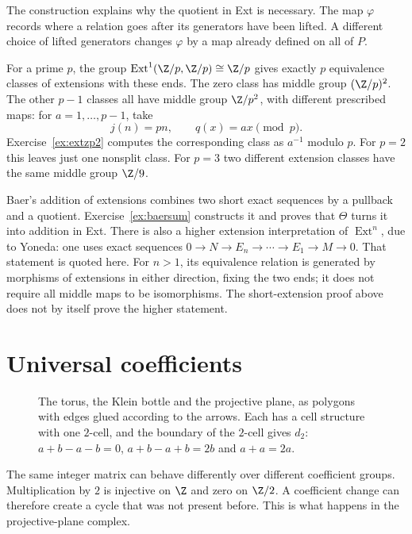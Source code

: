 The construction explains why the quotient in Ext is necessary. The map $\varphi$ records where a relation goes after its generators have been lifted. A different choice of lifted generators changes $\varphi$ by a map already defined on all of $P$.

\begin{example}\label{ex:extzp}
For a prime $p$, the group $\operatorname{Ext}^1(\Z/p,\Z/p)\cong\Z/p$ gives exactly $p$ equivalence classes of extensions with these ends. The zero class has middle group $(\Z/p)^2$. The other $p-1$ classes all have middle group $\Z/p^2$, with different prescribed maps: for $a=1,\ldots,p-1$, take
\[
j(n)=pn,\qquad q(x)=ax\pmod p.
\]
Exercise~\ref{ex:extzp2} computes the corresponding class as $a^{-1}$ modulo $p$. For $p=2$ this leaves just one nonsplit class. For $p=3$ two different extension classes have the same middle group $\Z/9$.
\end{example}

Baer's addition of extensions combines two short exact sequences by a pullback and a quotient. Exercise~\ref{ex:baersum} constructs it and proves that $\Theta$ turns it into addition in Ext. There is also a higher extension interpretation of $\operatorname{Ext}^n$, due to Yoneda: one uses exact sequences
$0\to N\to E_n\to\cdots\to E_1\to M\to0$.
That statement is quoted here. For $n>1$, its equivalence relation is generated by morphisms of extensions in either direction, fixing the two ends; it does not require all middle maps to be isomorphisms. The short-extension proof above does not by itself prove the higher statement.

\section{Universal coefficients}

\begin{figure}[ht]
\centering
{}
\caption{The torus, the Klein bottle and the projective plane, as polygons with edges glued according to the arrows. Each has a cell structure with one $2$-cell, and the boundary of the $2$-cell gives $d_2$:
$a+b-a-b=0$, $a+b-a+b=2b$ and $a+a=2a$.}
\label{fig:surfaces}
\end{figure}

The same integer matrix can behave differently over different coefficient groups. Multiplication by $2$ is injective on $\Z$ and zero on $\Z/2$. A coefficient change can therefore create a cycle that was not present before. This is what happens in the projective-plane complex.

